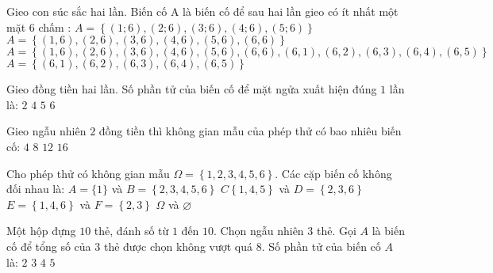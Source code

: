 \begin{ex}
Gieo con súc sắc hai lần. Biến cố A là biến cố để sau hai lần gieo có ít nhất một mặt 6 chấm :
\choice
{$A=\left\{ (1;6),(2;6),(3;6),(4;6),(5;6) \right\}$}
{$A=\left\{ \left(1{,}6\right),\left(2{,}6\right),\left(3{,}6\right),\left(4{,}6\right),\left(5{,}6\right),\left(6{,}6\right) \right\}$}
{\True $A=\left\{ \left(1{,}6\right),\left(2{,}6\right),\left(3{,}6\right),\left(4{,}6\right),\left(5{,}6\right),\left(6{,}6\right),\left(6{,}1\right),\left(6{,}2\right),\left(6{,}3\right),\left(6{,}4\right),\left(6{,}5\right) \right\}$}
{$A=\left\{ \left(6{,}1\right),\left(6{,}2\right),\left(6{,}3\right),\left(6{,}4\right),\left(6{,}5\right) \right\}$}
\end{ex}
\begin{ex}
Gieo đồng tiền hai lần. Số phần tử của biến cố để mặt ngửa xuất hiện đúng $1$ lần là:
\choice
{\True $2$}
{$4$}
{$5$}
{$6$}
\end{ex}
\begin{ex}
Gieo ngẫu nhiên $2$ đồng tiền thì không gian mẫu của phép thử có bao nhiêu biến cố:
\choice
{\True $4$}
{$8$}
{$12$}
{$16$}
\end{ex}
\begin{ex}
Cho phép thử có không gian mẫu $\Omega =\left\{ 1{,}2,3{,}4,5{,}6 \right\}$. Các cặp biến cố không đối nhau là:
\choice
{$A=\{1\}$ và $B=\left\{ 2{,}3,4{,}5,6 \right\}$}
{$C\left\{ 1{,}4,5 \right\}$ và $D=\left\{ 2{,}3,6 \right\}$}
{\True $E=\left\{ 1{,}4,6 \right\}$ và $F=\left\{ 2{,}3 \right\}$}
{$\Omega $ và $\varnothing $}
\end{ex}
\begin{ex}
Một hộp đựng $10$ thẻ, đánh số từ $1$ đến $10$. Chọn ngẫu nhiên $3$ thẻ. Gọi $A$ là biến cố để tổng số của $3$ thẻ được chọn không vượt quá $8$. Số phần tử của biến cố $A$ là:
\choice
{$2$}
{$3$}
{\True $4$}
{$5$}
\end{ex}
